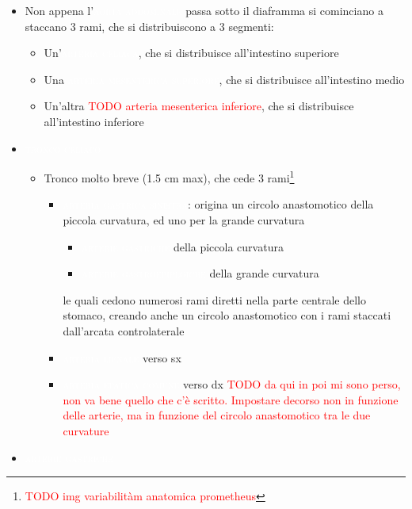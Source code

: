 \documentclass[italian,]{article}
\providecommand{\tightlist}{%
  \setlength{\itemsep}{0pt}\setlength{\parskip}{0pt}}
\newcommand{\art}[1]{\colorbox{RedOrange}{\textcolor{white}{\textsc{#1}}}}
\newcommand{\TODO}[1]{\textcolor{red}{\textsf{\footnotesize{TODO #1}}}} %
\begin{document}
\begin{itemize}
\item
  Non appena l'\art{aorta addominale} passa sotto il diaframma si
  cominciano a staccano 3 rami, che si distribuiscono a 3 segmenti:

  \begin{itemize}
  \tightlist
  \item
    Un'\art{arteria celiaca}, che si distribuisce all'intestino
    superiore
  \item
    Una \art{arteria mesenterica superiore}, che si distribuisce
    all'intestino medio
  \item
    Un'altra \TODO{arteria mesenterica inferiore}, che si distribuisce
    all'intestino inferiore
  \end{itemize}
\item
  \art{tronco celiaco}~

  \begin{itemize}
  \tightlist
  \item
    Tronco molto breve (1.5 cm max), che cede 3 rami\footnote{\TODO{img variabilitàm anatomica prometheus}}

    \begin{itemize}
    \tightlist
    \item
      \art{arteria gastrica sinistra}: origina un circolo anastomotico
      della piccola curvatura, ed uno per la grande curvatura

      \begin{itemize}
      \tightlist
      \item
        \art{arterie gastriche} della piccola curvatura
      \item
        \art{arterie gastroepiploiche} della grande curvatura
      \end{itemize}

      le quali cedono numerosi rami diretti nella parte centrale dello
      stomaco, creando anche un circolo anastomotico con i rami staccati
      dall'arcata controlaterale
    \item
      \art{arteria lienale} verso sx
    \item
      \art{arteria epatica comune} verso dx
      \TODO{da qui in poi mi sono perso, non va bene quello che c'è scritto. Impostare decorso non in funzione delle arterie, ma in funzione del circolo anastomotico tra le due curvature}
    \end{itemize}
  \end{itemize}
\item
  \art{arterie gastriche}


\end{itemize}
\end{document}
